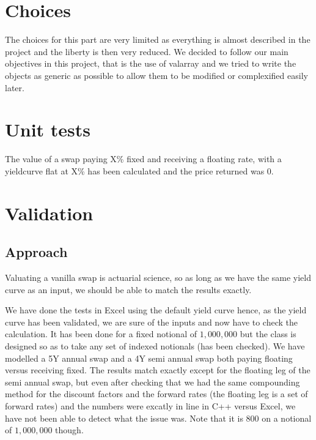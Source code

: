 \section{Choices}
The choices for this part are very limited as everything is almost
described in the project and the liberty is then very reduced. We
decided to follow our main objectives in this project, that is the
use of valarray and we tried to write the objects as generic as
possible to allow them to be modified or complexified easily
later.


\section{Unit tests}


The value of a swap paying X\% fixed and receiving a floating rate, with a yieldcurve flat at X\% has been calculated and the price returned was 0.


\section{Validation}


\subsection{Approach}

Valuating a vanilla swap is actuarial science, so as long as we have the same yield curve as an input, we should be able to match the results exactly. 

We have done the tests in Excel using the default yield curve hence, as the yield curve has been validated, we are sure of the inputs and now have to check the calculation. It has been done for a fixed notional of $1,000,000$ but the class is designed so as to take any set of indexed notionals (has been checked). We have modelled a 5Y annual swap and a 4Y semi annual swap both paying floating versus receiving fixed. The results match exactly except for the floating leg of the semi annual swap, but even after checking that we had the same compounding method for the discount factors and the forward rates (the floating leg is a set of forward rates) and the numbers were excatly in line in C++ versus Excel, we have not been able to detect what the issue was. Note that it is $800$ on a notional of $1,000,000$ though. 

